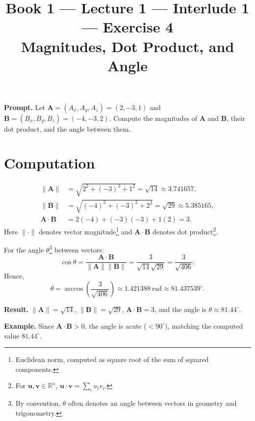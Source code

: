 \documentclass[11pt]{article}
\title{\textbf{Book 1 --- Lecture 1 --- Interlude 1 --- Exercise 4}\\[2mm]
\large Magnitudes, Dot Product, and Angle}
\author{}
\date{}
\newcommand{\promptbox}[1]{%
  \begingroup\setlength{\fboxsep}{10pt}\noindent
  \colorbox{blue!8}{\parbox{\dimexpr\linewidth-2\fboxsep\relax}{\textbf{Prompt. }#1}}
  \endgroup
}
\newcommand{\resultbox}[1]{%
  \begingroup\setlength{\fboxsep}{10pt}\noindent
  \colorbox{purple!8}{\parbox{\dimexpr\linewidth-2\fboxsep\relax}{\textbf{Result. }#1}}
  \endgroup
}
\newcommand{\examplebox}[1]{%
  \begingroup\setlength{\fboxsep}{10pt}\noindent
  \colorbox{green!8}{\parbox{\dimexpr\linewidth-2\fboxsep\relax}{\textbf{Example. }#1}}
  \endgroup
}
\begin{document}
\maketitle

\promptbox{Let \(\mathbf{A}=(A_x,A_y,A_z)=(2,-3,1)\) and
\(\mathbf{B}=(B_x,B_y,B_z)=(-4,-3,2)\). Compute the magnitudes of
\(\mathbf{A}\) and \(\mathbf{B}\), their dot product, and the angle between
them.}

\section*{Computation}
\[
\begin{aligned}
\lVert\mathbf{A}\rVert &= \sqrt{2^2+(-3)^2+1^2}=\sqrt{14}\approx 3.741657,\\
\lVert\mathbf{B}\rVert &= \sqrt{(-4)^2+(-3)^2+2^2}=\sqrt{29}\approx 5.385165,\\
\mathbf{A}\cdot\mathbf{B} &= 2(-4)+(-3)(-3)+1(2)=3.
\end{aligned}
\]
Here \(\lVert\cdot\rVert\) denotes vector magnitude\footnote{Euclidean norm,
computed as square root of the sum of squared components.} and
\(\mathbf{A}\cdot\mathbf{B}\) denotes dot product\footnote{For
\(\mathbf{u},\mathbf{v}\in\mathbb{R}^n\), \(\mathbf{u}\cdot\mathbf{v}=\sum_i u_i
v_i\).}.

For the angle \(\theta\)\footnote{By convention, \(\theta\) often denotes an
angle between vectors in geometry and trigonometry.} between vectors:
\[
\cos\theta=\frac{\mathbf{A}\cdot\mathbf{B}}{\lVert\mathbf{A}\rVert\lVert\mathbf{B}\rVert}
=\frac{3}{\sqrt{14}\sqrt{29}}=\frac{3}{\sqrt{406}}.
\]
Hence,
\[
\theta=\arccos\!\left(\frac{3}{\sqrt{406}}\right)\approx 1.421388~\text{rad}
\approx 81.437539^\circ.
\]

\resultbox{\(\lVert\mathbf{A}\rVert=\sqrt{14}\), \(\lVert\mathbf{B}\rVert=\sqrt{29}\),
\(\mathbf{A}\cdot\mathbf{B}=3\), and the angle is
\(\theta\approx 81.44^\circ\).}

\examplebox{Since \(\mathbf{A}\cdot\mathbf{B}>0\), the angle is acute
(\(<90^\circ\)), matching the computed value \(81.44^\circ\).}
\end{document}
